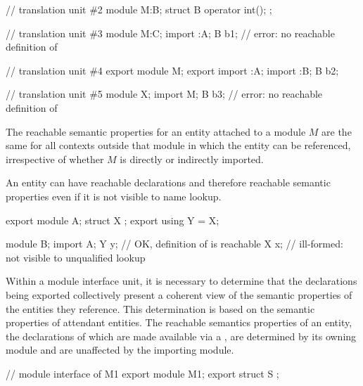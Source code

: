 \begin{std.txt}
\begin{example}
\begin{codeblock}
// translation unit \#2
module M:B;
struct B {
  operator int();
};

// translation unit \#3
module M:C;
import :A;
B b1;                     // error: no reachable definition of 

// translation unit \#4
export module M;
export import :A;
import :B;
B b2;

// translation unit \#5
module X;
import M;
B b3;                     // error: no reachable definition of 
\end{codeblock}
\end{example}
\exitnote

\alinea
\enternote
The reachable semantic properties for an entity attached to a module $M$
are the same for all contexts outside that module in which the entity
can be referenced, irrespective of whether $M$ is directly or indirectly
imported.
\exitnote

\alinea
\enternote
An entity can have reachable declarations and therefore
reachable semantic properties even if it is not visible
to name lookup.
\exitnote
\begin{example}
\begin{codeblock}
export module A;
struct X {};
export using Y = X;

module B;
import A;
Y y;            // OK, definition of  is reachable
X x;            // ill-formed:  not visible to unqualified lookup
\end{codeblock}
\end{example}

\begin{before}\color{addclr}
  \alinea
  Within a module interface unit, it is necessary to determine that the
  declarations being exported collectively present a coherent view of 
  the semantic properties of the entities they reference.  This determination
  is based on the semantic properties of attendant entities.
  \enternote
  The reachable semantics properties of an entity, the declarations of which
  are made available via a , are
  determined by its owning module and are unaffected by the importing module.
\end{before}\begin{before}\color{addclr}
  \begin{example}
    \begin{codeblock}
      // module interface of M1
      export module M1;
      export struct S { };


\end{codeblock}
\end{example}
\end{before}
\end{std.txt}
